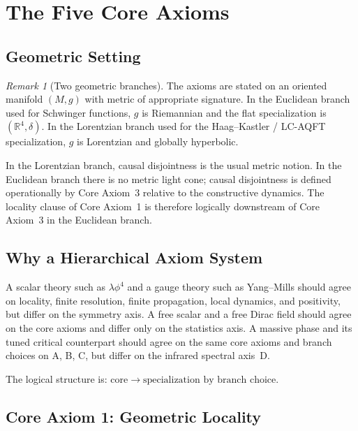 \documentclass[12pt,a4paper]{article}
\theoremstyle{plain}
\theoremstyle{definition}
\theoremstyle{remark}
\newtheorem{remark}[theorem]{Remark}
\newcommand{\real}{\mathbb{R}}
\begin{document}
\section{The Five Core Axioms}
\label{sec:core}

\subsection{Geometric Setting}

\begin{remark}[Two geometric branches]\label{rem:geom}
  The axioms are stated on an oriented manifold $(M,g)$ with metric of
  appropriate signature. In the Euclidean branch used for Schwinger
  functions, $g$ is Riemannian and the flat specialization is
  $(\real^4, \delta)$. In the Lorentzian branch used for the
  Haag--Kastler / LC-AQFT specialization, $g$ is Lorentzian and
  globally hyperbolic.

  In the Lorentzian branch, causal disjointness is the usual metric
  notion. In the Euclidean branch there is no metric light cone;
  causal disjointness is defined operationally by Core Axiom~3
  relative to the constructive dynamics. The locality clause of Core
  Axiom~1 is therefore logically downstream of Core Axiom~3 in the
  Euclidean branch.
\end{remark}


\subsection{Why a Hierarchical Axiom System}

A scalar theory such as $\lambda\phi^4$ and a gauge theory such as
Yang--Mills should agree on locality, finite resolution, finite
propagation, local dynamics, and positivity, but differ on the
symmetry axis. A free scalar and a free Dirac field should agree on
the core axioms and differ only on the statistics axis. A massive
phase and its tuned critical counterpart should agree on the same
core axioms and branch choices on A, B, C, but differ on the
infrared spectral axis~D.

The logical structure is:
$\text{core} \longrightarrow \text{specialization by branch choice}.$


\subsection{Core Axiom 1: Geometric Locality}
\end{document}
